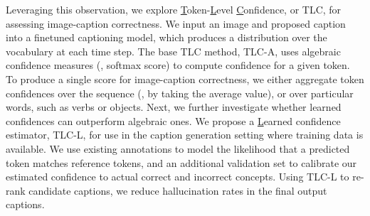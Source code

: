 \documentclass[10pt,twocolumn,letterpaper]{article}
\newcommand{\ApproachName}{TLC\xspace}
\newcommand{\ApproachNameLong}{\underline{T}oken-\underline{L}evel \underline{C}onfidence\xspace}
\begin{document}
\begin{table}
  \centering

\end{table}
 
Leveraging this observation, we explore \ApproachNameLong, or \ApproachName, for assessing image-caption correctness.
We input an image and proposed caption into a finetuned captioning model, which produces a distribution over the vocabulary at each time step. The base \ApproachName method, \ApproachName-A, uses algebraic confidence measures (\eg, softmax score) to compute confidence for a given token. To produce a single score for image-caption correctness, we either aggregate token confidences over the sequence (\eg, by taking the average value), or over particular words, such as verbs or objects. 
Next, we further investigate whether learned confidences can outperform algebraic ones.
We propose a \underline{L}earned confidence estimator, \ApproachName-L, for use in the caption generation setting where training data is available. We use existing annotations to model the likelihood that a predicted token matches reference tokens, and an additional validation set to calibrate our estimated confidence to actual correct and incorrect concepts. Using \ApproachName-L to re-rank candidate captions, we reduce hallucination rates in the final output captions.
\end{document}
